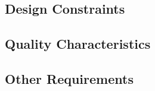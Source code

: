 \subsection{Design Constraints}
\subsection{Quality Characteristics}
\subsection{Other Requirements}
